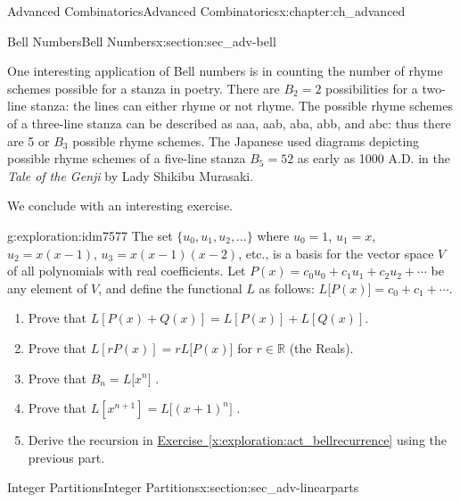 \documentclass[oneside,10pt,]{book}
\numberwithin{equation}{chapter}
\def\R{\mathbb R}
\begin{document}
\begin{chapterptx}{Advanced Combinatorics}{}{Advanced Combinatorics}{}{}{x:chapter:ch_advanced}
\begin{sectionptx}{Bell Numbers}{}{Bell Numbers}{}{}{x:section:sec_adv-bell}
\par
One interesting application of Bell numbers is in counting the number of rhyme schemes possible for a stanza in poetry. There are \(B_{2} = 2\) possibilities for a two-line stanza: the lines can either rhyme or not rhyme. The possible rhyme schemes of a three-line stanza can be described as aaa, aab, aba, abb, and abc: thus there are 5 or \(B_{3}\) possible rhyme schemes. The Japanese used diagrams depicting possible rhyme schemes of a five-line stanza \(B_{5} = 52\) as early as 1000 A.D. in the \emph{Tale of the Genji} by Lady Shikibu Murasaki.%
\par
We conclude with an interesting exercise.%
\begin{exploration}{}{g:exploration:idm7577}%
The set \(\{u_{0}, u_{1}, u_{2}, \ldots \}\) where \(u_{0} = 1\), \(u_{1} = x\), \(u_{2} = x(x - 1)\), \(u_{3} = x(x - 1)(x - 2)\), etc., is a basis for the vector space \(V\) of all polynomials with real coefficients. Let \(P(x) = c_{0}u_{0} + c_{1}u_{1} + c_{2}u_{2} + \cdots\) be any element of \(V\), and define the functional \(L\) as follows: \(L\lbrack P(x)\rbrack = c_{0} + c_{1} + \cdots\).%
\par
%
\begin{enumerate}
\item{}Prove that \(L\left\lbrack P\left( x \right) + Q\left( x \right) \right\rbrack = L\left\lbrack P\left( x \right) \right\rbrack + L\left\lbrack Q\left( x \right) \right\rbrack.\)%
\item{}Prove that \(L\left\lbrack rP \left( x \right) \right\rbrack = rL\lbrack P\left( x \right)\rbrack\) for \(r \in \R\) (the Reals).%
\item{}Prove that \(B_{n} = L\lbrack x^{n}\rbrack\) .%
\item{}Prove that \(L\left\lbrack x^{n + 1} \right\rbrack = L\lbrack\left( x + 1 \right)^{n}\rbrack\) .%
\item{}Derive the recursion in \hyperref[x:exploration:act_bellrecurrence]{Exercise~\ref{x:exploration:act_bellrecurrence}} using the previous part.%
\end{enumerate}
%
\end{exploration}
\end{sectionptx}
%
%
\typeout{************************************************}
\typeout{************************************************}
%
\begin{sectionptx}{Integer Partitions}{}{Integer Partitions}{}{}{x:section:sec_adv-linearparts}
\begin{introduction}{}%

\end{introduction}
\end{sectionptx}
\end{chapterptx}
\end{document}
